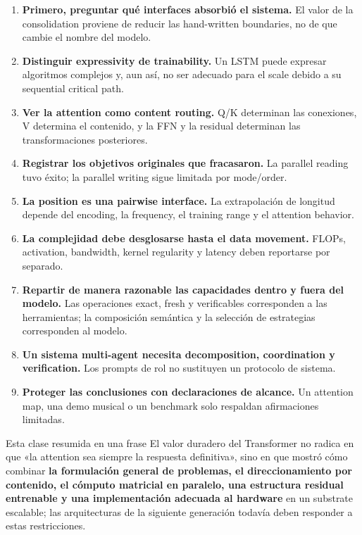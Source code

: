 \documentclass[a4paper]{article}
\begin{document}
\begin{enumerate}
  \item \textbf{Primero, preguntar qué interfaces absorbió el sistema.} El valor de la consolidation proviene de reducir las hand-written boundaries, no de que cambie el nombre del modelo.
  \item \textbf{Distinguir expressivity de trainability.} Un LSTM puede expresar algoritmos complejos y, aun así, no ser adecuado para el scale debido a su sequential critical path.
  \item \textbf{Ver la attention como content routing.} Q/K determinan las conexiones, V determina el contenido, y la FFN y la residual determinan las transformaciones posteriores.
  \item \textbf{Registrar los objetivos originales que fracasaron.} La parallel reading tuvo éxito; la parallel writing sigue limitada por mode/order.
  \item \textbf{La position es una pairwise interface.} La extrapolación de longitud depende del encoding, la frequency, el training range y el attention behavior.
  \item \textbf{La complejidad debe desglosarse hasta el data movement.} FLOPs, activation, bandwidth, kernel regularity y latency deben reportarse por separado.
  \item \textbf{Repartir de manera razonable las capacidades dentro y fuera del modelo.} Las operaciones exact, fresh y verificables corresponden a las herramientas; la composición semántica y la selección de estrategias corresponden al modelo.
  \item \textbf{Un sistema multi-agent necesita decomposition, coordination y verification.} Los prompts de rol no sustituyen un protocolo de sistema.
  \item \textbf{Proteger las conclusiones con declaraciones de alcance.} Un attention map, una demo musical o un benchmark solo respaldan afirmaciones limitadas.
\end{enumerate}

\begin{importantbox}{Esta clase resumida en una frase}
El valor duradero del Transformer no radica en que «la attention sea siempre la respuesta definitiva», sino en que mostró cómo combinar \textbf{la formulación general de problemas, el direccionamiento por contenido, el cómputo matricial en paralelo, una estructura residual entrenable y una implementación adecuada al hardware} en un substrate escalable; las arquitecturas de la siguiente generación todavía deben responder a estas restricciones.
\end{importantbox}
\end{document}
